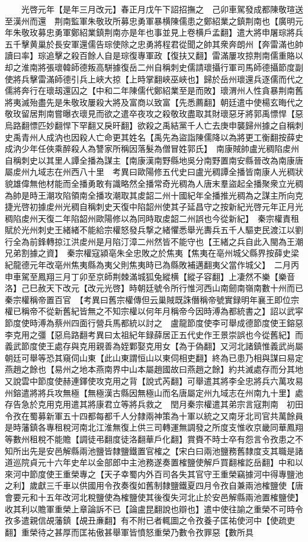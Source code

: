 　　光啓元年【是年三月改元】春正月戊午下詔招撫之　己卯車駕發成都陳敬瑄送至漢州而還　荆南監軍朱敬玫所募忠勇軍暴横陳儒患之鄭紹業之鎮荆南也【廣明元年朱敬玫募忠勇軍鄭紹業鎮荆南亦是年也事並見上卷横戶孟翻】遣大將申屠琮將兵五千擊黄巢於長安軍還儒告琮使除之忠勇將程君從聞之帥其衆奔朗州【奔雷滿也帥讀曰率】琮追擊之殺百餘人自是琮復專軍政【復扶又翻】雷滿屢攻掠荆南儒重賂以却之淮南將張瓌韓師德叛高駢據復岳二州自稱刺史儒請瓌攝行軍司馬師德攝節度副使將兵擊雷滿師德引兵上峽大掠【上時掌翻峽巫峽也】歸於岳州瓌還兵逐儒而代之儒將奔行在瓌刼還囚之【中和二年陳儒代鄭紹業至是而敗】瓌渭州人性貪暴荆南舊將夷滅殆盡先是朱敬玫屢殺大將及富商以致富【先悉薦翻】朝廷遣中使楊玄晦代之敬玫留居荆南嘗曝衣瓌見而欲之遣卒夜攻之殺敬玫盡取其財瓌惡牙將郭禹慓悍【惡烏路翻慓匹妙翻悍下罕翻又戾旰翻】欲殺之禹結黨千人亡去庚申襲歸州據之自稱刺史禹青州人成汭也因殺人亡命更其姓名【禹先為盜詣陳儒降以為將更工衡翻按薛史成汭少年任俠乘醉殺人為讐家所稱因落髮為僧冒姓郭氏】　南康賊帥盧光稠陷䖍州自稱刺史以其里人譚全播為謀主【南康漢南野縣地吳分南野置南安縣晉改為南康唐屬䖍州九域志在州西八十里　考異曰歐陽修五代史曰盧光稠譚全播皆南康人光稠狀貌雄偉無他材能而全播勇敢有識略然全播常奇光稠為人唐末羣盜起全播聚衆立光稠為帥是時王潮攻陷領南全播攻潮取其䖍韶二州十國紀年全播推光稠為之謀主所向克捷光啓初據䖍州光稠自稱刺史天復中陷韶州使其子延昌守之按新紀光啓元年正月光稠陷䖍州天復二年陷韶州歐陽修以為同時取䖍韶二州誤也今從新紀】　秦宗權責租賦於光州刺史王緒緒不能給宗權怒發兵撃之緒懼悉舉光夀兵五千人驅吏民渡江以劉行全為前鋒轉掠江洪䖍州是月陷汀漳二州然皆不能守也【王緒之兵自此入閩為王潮兄弟割據之資】　秦宗權寇潁亳朱全忠敗之於焦夷【焦夷在亳州城父縣界按薛史梁紀龍德元年改亳州焦夷縣為夷父則焦夷時已為縣敗補邁翻夷父當作城父】　二月丙申車駕至鳳翔三月丁卯至京師荆棘滿城狐兔縱横【縱子容翻】上凄然不樂【樂音洛】己巳赦天下改元【改元光啓】時朝廷號令所行惟河西山南劒南嶺南數十州而已　秦宗權稱帝置百官　【考異曰舊宗權傳但云巢賊既誅僭稱帝號實録明年襄王即位宗權已稱帝不從新舊紀皆無之不知宗權以何年月稱帝今因時溥為都統書之】詔以武寜節度使時溥為蔡州四面行營兵馬都統以討之　盧龍節度使李可舉成德節度使王鎔惡李克用之彊【惡烏路翻考異曰太祖紀年録薛居正五代史作王景崇誤也今從舊紀】而義武節度使王處存與克用親善為姪鄴娶克用女【為于偽翻】又河北諸鎮惟義武尚屬朝廷可舉等恐其窺伺山東【此山東謂恒山以東伺相吏翻】終為已患乃相與謀曰易定燕趙之餘也【易州之地本燕南界中山本屬趙國故曰燕趙之餘】約共滅處存而分其地又說雲中節度使赫連鐸使攻克用之背【說式芮翻】可舉遣其將李全忠將兵六萬攻易州鎔遣將將兵攻無極【無極漢古縣因無極山而名唐屬定州九域志在州南九十里】處存告急於克用克用遣其將康君立等將兵救之　閏月秦宗權遣其弟宗言寇荆南　初田令孜在蜀募新軍五十四都每都千人分隸兩神策為十軍以統之又南牙北司官共萬餘員是時藩鎮各專租稅河南北江淮無復上供三司轉運無調發之所度支惟收京畿同華鳳翔等數州租稅不能贍【調徒弔翻度徒洛翻華戶化翻】賞賚不時士卒有怨言令孜患之不知所出先是安邑解縣兩池鹽皆隸鹽鐵置官榷之【宋白曰兩池鹽務舊隸度支其職是諸道巡院貞元十六年史牟以金部郎中主池務遂奏置榷鹽使解戶買翻榷訖岳翻】中和以來河中節度使王重榮專之【天子幸蜀内外百司各失其官守王重榮竊據河中得專鹽池之利】歲獻三千車以供國用令孜奏復如舊制隸鹽鐵夏四月令孜自兼兩池榷鹽使【唐會要元和十五年改河北稅鹽使為榷鹽使其後復失河北止於安邑解縣兩池置榷鹽使】收其利以贍軍重榮上章論訴不已【論盧昆翻說也辯也】遣中使往諭之重榮不可時令孜多遣親信覘藩鎮【覘丑亷翻】有不附已者輒圖之令孜養子匡祐使河中【使疏吏翻】重榮待之甚厚而匡祐傲甚舉軍皆憤怒重榮乃數令孜罪惡【數所具